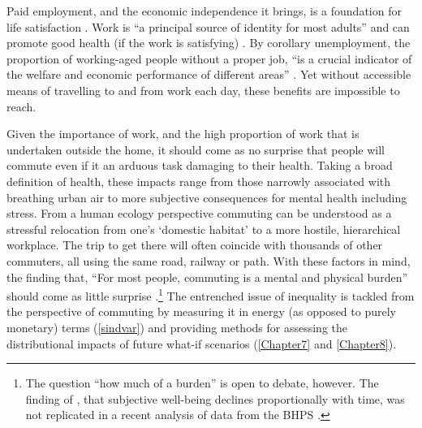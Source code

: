 \documentclass[a4paper, 11pt, twoside]{Thesis}
\begin{document}
Paid employment, and the
economic independence it brings, is a foundation for life satisfaction
\citep{Jahoda1982}. Work is ``a principal source of identity for most adults''
\citep{Tausig1999} and can promote good health (if the work is satisfying)
\citep{Graetz1993}. By corollary unemployment, the proportion of working-aged
people without a proper job, ``is a crucial indicator of the welfare and
economic performance of different areas'' \citep[141]{Coombes1982}. Yet without
accessible means of travelling to and from work each day, these benefits are
impossible to reach.

Given the importance of work, and the high proportion of work that is
undertaken outside the home, it should come as no surprise that
people will commute even if it an arduous task damaging to their health.
Taking a broad definition of health, these impacts range from those
narrowly associated with breathing urban air to more subjective consequences for
mental health including stress. From a human ecology perspective
commuting can be understood as a stressful relocation from one's
`domestic habitat' to a more hostile, hierarchical workplace. 
The trip to get there will often coincide with thousands of other
commuters, all using the same road, railway or path. With these factors
in mind, the finding that, ``For most people,
commuting is a mental and physical burden'' should come as little surprise
\citep{Stutzer2007}.\footnote{The question
``how much of a burden'' is open to debate, however.
The finding of \citet{Stutzer2008}, that subjective well-being
declines proportionally with time, was not replicated in a
recent analysis of data from the BHPS \citep{Mumford2012}.}
The entrenched issue of inequality is tackled from
the perspective of commuting by measuring it in energy
(as opposed to purely monetary) terms (\cref{sindvar}) and providing
methods for assessing the distributional impacts of future
what-if scenarios (\cref{Chapter7} and \cref{Chapter8}).
\end{document}
